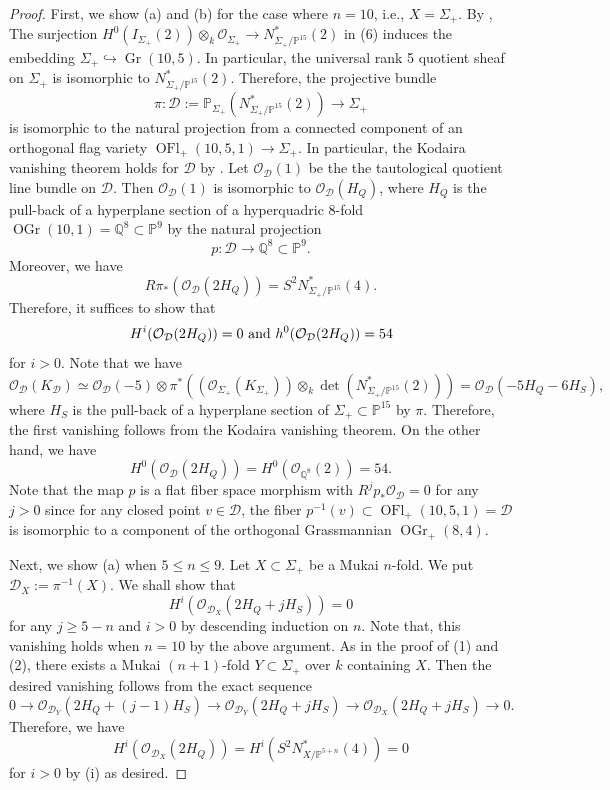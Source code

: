 \documentclass[autodetect-engine, a4paper]{amsart}
\theoremstyle{definition}
\def\P{{\mathbb P}}
\def\cO{\mathcal{O}}
\DeclareMathOperator\Gr{\mathrm{Gr}}
\DeclareMathOperator\OGr{\mathrm{OGr}}
\DeclareMathOperator\OFl{\mathrm{OFl}}
\begin{document}
\begin{proof}
{First, we show (a) and (b) for the case where $n=10$, i.e., $X = \Sigma_{+}$.
By \cite[Corollary 2.4]{Mukaicurve},
The surjection $H^0(I_{\Sigma_{+}}(2)) \otimes_{k} \cO_{\Sigma_{+}} \rightarrow N^{\ast}_{\Sigma_{+}/\P^{15}} (2)$ in (6) induces the embedding $\Sigma_{+} \hookrightarrow \Gr (10,5)$.
In particular, the universal rank 5 quotient sheaf on $\Sigma_+$ is isomorphic to $N^{\ast}_{\Sigma_{+}/\P^{15}} (2)$.
Therefore, the projective bundle 
\[
\pi \colon \mathcal{D} := \P_{\Sigma_{+}} (N^{\ast}_{\Sigma_+/\P^{15}}(2)) \rightarrow \Sigma_+
\]
is isomorphic to the natural projection from a connected component of an orthogonal flag variety $\OFl_{+} (10,5,1) \rightarrow \Sigma_+$.
In particular, the Kodaira vanishing theorem holds for $\mathcal{D}$ by \cite[Proposition 2 and Theorem 2]{Mehta-Ramanathan}.
Let $\cO_{\mathcal{D}}(1)$ be the the tautological quotient line bundle on $\mathcal{D}$.
Then $\cO_{\mathcal{D}}(1)$ is isomorphic to $\cO_{\mathcal{D}} (H_{Q})$, where $H_Q$ is the pull-back of a hyperplane section of a hyperquadric 8-fold $\OGr(10,1) = \mathbb{Q}^8 \subset \P^{9}$ by the natural projection
\[
p \colon \mathcal{D} \rightarrow \mathbb{Q}^{8} \subset \P^{9}.
\]
Moreover, we have
\[
R\pi_* (\cO_{\mathcal{D}}(2 H_Q)) = S^2 N_{\Sigma_+/\P^{15}}^{*}(4).
\]
Therefore, it suffices to show that 
\[
H^i (\cO_{\mathcal{D}}(2H_Q)) =0 \textup{ and } h^0(\cO_{\mathcal{D}}(2H_Q)) =54
\] 
for $i>0.$
Note that we have
\[
\cO_{\mathcal{D}} (K_{\mathcal{D}}) \simeq  \cO_{\mathcal{D}}(-5) \otimes \pi^* ((\cO_{\Sigma_+} (K_{\Sigma_+})) \otimes_{k} \det (N_{\Sigma_+/\P^{15}}^{*}(2))) =
\cO_{\mathcal{D}} (-5 H_{Q} - 6 H_{S}),
\]
where $H_{S}$ is the pull-back of a hyperplane section of $\Sigma_{+} \subset \P^{15}$ by $\pi$.
Therefore, the first vanishing follows from the Kodaira vanishing theorem.
On the other hand, we have
\[
H^0(\cO_{\mathcal{D}} (2H_{Q})) =H^0(\cO_{\mathbb{Q}^8} (2)) =54.
\]
Note that the map $p$ is a flat fiber space morphism with $R^j p_* \cO_{\mathcal{D}} =0$ for any $j>0$ since for any closed point $v \in \mathcal{D}$, the fiber $p^{-1}(v) \subset \OFl_{+}(10,5,1)=\mathcal{D}$ is isomorphic to a component of the orthogonal Grassmannian $\OGr_{+}(8,4)$.

Next, we show (a) when $5 \leq n \leq 9$.
Let $X \subset \Sigma_{+}$ be a Mukai $n$-fold.
We put $\mathcal{D}_{X} := \pi^{-1} (X)$.
We shall show that 
\begin{equation}
H^i (\cO_{\mathcal{D}_{X}} (2H_{Q} + j H_{S}) ) =0 
\tag{i}
\end{equation}
for any $j\geq 5-n$ and $i>0$ by descending induction on $n$.
Note that, this vanishing holds when $n=10$ by the above argument.
As in the proof of (1) and (2), there exists a Mukai $(n+1)$-fold $Y \subset \Sigma_{+}$ over $k$ containing $X$.
Then the desired vanishing follows from the exact sequence
\begin{equation}
0 \rightarrow \cO_{\mathcal{D}_Y} (2H_{Q} + (j-1) H_{S})
\rightarrow \cO_{\mathcal{D}_Y} (2H_{Q} + j H_{S})
\rightarrow \cO_{\mathcal{D}_X} (2H_{Q} + j H_{S}) \rightarrow 0.
\tag{$**$}
\end{equation}
Therefore, we have 
\[
H^i (\cO_{\mathcal{D}_{X}} (2H_{Q})) = H^i (S^2 N^{\ast}_{X/\P^{5+n}} (4)) =0
\]
for $i>0$ by (i) as desired.

}
\end{proof}
\end{document}
